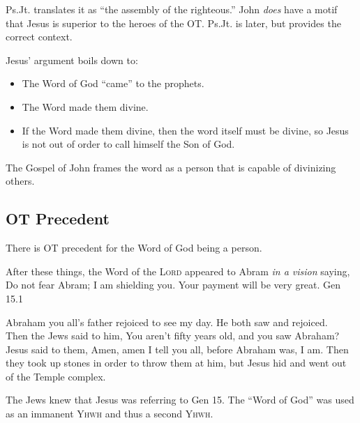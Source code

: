 \documentclass{beamer}
\begin{document}
\begin{frame}
  Ps.Jt. translates it as ``the assembly of the righteous.''
  John \emph{does} have a motif that Jesus is superior to the heroes of the OT.
  Ps.Jt. is later, but provides the correct context.
\end{frame}

\begin{frame}
  Jesus' argument boils down to:\pause
  \begin{itemize}
	\item The Word of God ``came'' to the prophets.\pause
	\item The Word made them divine.\pause
	\item If the Word made them divine, then the word itself must be divine, so Jesus is not out of order to call himself the Son of God.
  \end{itemize}
\end{frame}

\begin{frame}
  The Gospel of John frames the word as a person that is capable of divinizing others.
\end{frame}

\subsection{OT Precedent}

\begin{frame}
  There is OT precedent for the Word of God being a person.
\end{frame}

\begin{frame}
  After these things, the Word of the \textsc{Lord} appeared to Abram \emph{in a vision} saying, Do not fear Abram; I am shielding you. Your payment will be very great. Gen 15.1
\end{frame}

\begin{frame}
  Abraham you all's father rejoiced to see my day. He both saw and rejoiced.\\
  Then the Jews said to him, You aren't fifty years old, and you saw Abraham?\\
  Jesus said to them, Amen, amen I tell you all, before Abraham was, I am.
  Then they took up stones in order to throw them at him, but Jesus hid and went out of the Temple complex.
\end{frame}

\begin{frame}
  The Jews knew that Jesus was referring to Gen 15.
  The ``Word of God'' was used as an immanent \textsc{Yhwh} and thus a second \textsc{Yhwh}.
\end{frame}
\end{document}

